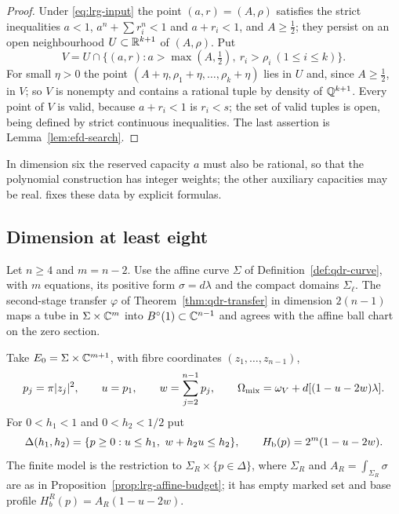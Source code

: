 \begin{proof}
Under \eqref{eq:lrg-input} the point $(a,r)=(A,\rho)$ satisfies the strict inequalities $a<1$, $a^n+\sum r_i^n<1$
and $a+r_i<1$, and $A\ge\frac12$; they persist on an open neighbourhood $U\subset\mathbb{R}^{k+1}$ of $(A,\rho)$. Put
\[
 V=U\cap\{(a,r):a>\max(A,\tfrac12),\ r_i>\rho_i\ (1\le i\le k)\}.
\]
For small $\eta>0$ the point $(A+\eta,\rho_1+\eta,\dots,\rho_k+\eta)$ lies in $U$ and, since $A\ge\frac12$, in $V$;
so $V$ is nonempty and contains a rational tuple by density of $\mathbb{Q}^{k+1}$. Every point of $V$ is valid, because
$a+r_i<1$ is $r_i<s$; the set of valid tuples is open, being defined by strict continuous inequalities. The last
assertion is Lemma~\ref{lem:efd-search}.
\end{proof}

In dimension six the reserved capacity $a$ must also be rational, so that the polynomial construction has integer
weights; the other auxiliary capacities may be real.  fixes these data by
explicit formulas.

\subsection{Dimension at least eight}\label{sec:lrg-high}

Let $n\ge4$ and $m=n-2$. Use the affine curve $\Sigma$ of Definition~\ref{def:qdr-curve}, with $m$ equations,
its positive form $\sigma=d\lambda$ and the compact domains $\Sigma_\ell$. The second-stage transfer $\varphi$ of
Theorem~\ref{thm:qdr-transfer} in dimension $2(n-1)$ maps a tube in $\Sigma\times\mathbb{C}^m$ into $B^{\circ}(1)\subset\mathbb{C}^{n-1}$
and agrees with the affine ball chart on the zero section.

\begin{definition}\label{def:lrg-mixed-model}
Take $E_0=\Sigma\times\mathbb{C}^{m+1}$, with fibre coordinates $(z_1,\dots,z_{n-1})$,
\[
 p_j=\pi|z_j|^2,\qquad u=p_1,\qquad w=\sum_{j=2}^{n-1}p_j,\qquad
 \Omega_{\rm mix}=\omega_V+d[(1-u-2w)\lambda].
\]
For $0<h_1<1$ and $0<h_2<1/2$ put
\[
 \Delta(h_1,h_2)=\{p\ge0:u\le h_1,\ w+h_2u\le h_2\},\qquad
 \Hb(p)=2^m(1-u-2w).
\]
The finite model is the restriction to $\Sigma_R\times\{p\in\Delta\}$, where $\Sigma_R$ and $A_R=\int_{\Sigma_R}\sigma$
are as in Proposition~\ref{prop:lrg-affine-budget}; it has empty marked set and base profile $H_b^R(p)=A_R(1-u-2w)$.
\end{definition}

